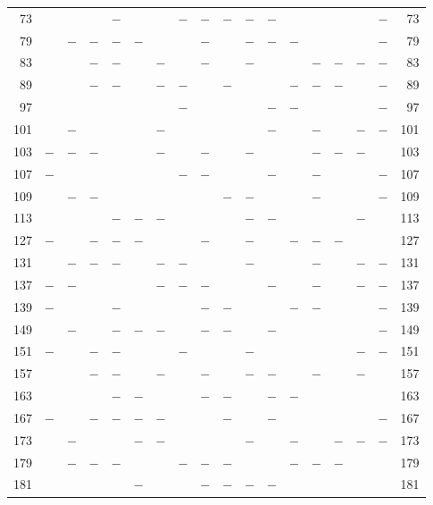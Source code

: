 \begin{center}
\begin{tabular}{r|c|c|c|c|c|c|c|c|c|c|c|c|c|c|c|c|r}
73 &  &  &  & $-$ &  &  & $-$ & $-$ & $-$ & $-$ & $-$ &  &  &  &  & $-$ & 73\\
79 &  & $-$ & $-$ & $-$ & $-$ &  &  & $-$ &  & $-$ & $-$ & $-$ &  &  &  & $-$ & 79\\
83 &  &  & $-$ & $-$ &  & $-$ &  & $-$ &  & $-$ &  &  & $-$ & $-$ & $-$ & $-$ & 83\\
89 &  &  & $-$ & $-$ &  & $-$ & $-$ &  & $-$ &  &  & $-$ & $-$ & $-$ &  & $-$ & 89\\
97 &  &  &  &  &  &  & $-$ &  &  &  & $-$ & $-$ &  &  &  & $-$ & 97\\
101 &  & $-$ &  &  &  & $-$ &  &  &  &  & $-$ &  & $-$ &  & $-$ & $-$ & 101\\
103 & $-$ & $-$ & $-$ &  &  & $-$ &  & $-$ &  & $-$ &  &  & $-$ & $-$ & $-$ &  & 103\\
107 & $-$ &  &  &  &  &  & $-$ & $-$ &  &  & $-$ &  & $-$ &  &  & $-$ & 107\\
109 &  & $-$ & $-$ &  &  &  &  &  & $-$ & $-$ &  &  & $-$ &  &  & $-$ & 109\\
113 &  &  &  & $-$ & $-$ & $-$ &  &  &  & $-$ & $-$ &  &  &  & $-$ &  & 113\\
127 & $-$ &  & $-$ & $-$ & $-$ &  &  & $-$ &  & $-$ &  & $-$ & $-$ & $-$ &  &  & 127\\
131 &  & $-$ & $-$ & $-$ &  & $-$ & $-$ &  &  & $-$ &  &  & $-$ &  & $-$ & $-$ & 131\\
137 & $-$ & $-$ &  &  &  & $-$ & $-$ & $-$ &  &  & $-$ &  & $-$ &  & $-$ & $-$ & 137\\
139 & $-$ &  &  & $-$ &  &  &  & $-$ & $-$ &  &  & $-$ & $-$ &  &  & $-$ & 139\\
149 &  & $-$ &  & $-$ & $-$ & $-$ &  & $-$ & $-$ &  & $-$ &  &  &  &  & $-$ & 149\\
151 & $-$ &  & $-$ & $-$ &  &  & $-$ &  &  & $-$ &  &  &  &  & $-$ & $-$ & 151\\
157 &  &  & $-$ & $-$ &  & $-$ &  & $-$ &  & $-$ & $-$ &  & $-$ &  & $-$ &  & 157\\
163 &  &  &  & $-$ & $-$ &  &  & $-$ & $-$ &  & $-$ & $-$ &  &  &  &  & 163\\
167 & $-$ &  & $-$ & $-$ & $-$ & $-$ &  &  & $-$ &  & $-$ &  &  &  &  & $-$ & 167\\
173 &  & $-$ &  &  & $-$ & $-$ &  &  &  & $-$ &  & $-$ &  & $-$ & $-$ & $-$ & 173\\
179 &  & $-$ & $-$ & $-$ &  &  & $-$ & $-$ & $-$ &  &  & $-$ & $-$ & $-$ &  &  & 179\\
181 &  &  &  &  & $-$ &  &  & $-$ & $-$ & $-$ & $-$ &  &  &  &  &  & 181\\

\end{tabular}
\end{center}
